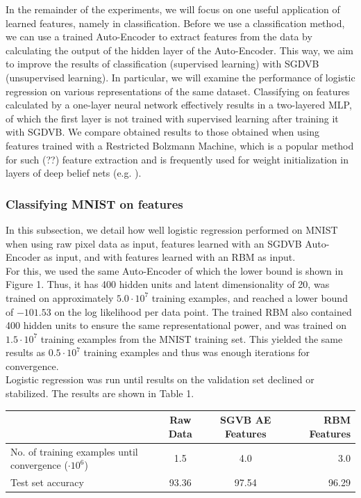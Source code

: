 \documentclass{article}
\begin{document}
In the remainder of the experiments, we will focus on one useful application of learned features, namely in classification. Before we use a classification method, we can use a trained Auto-Encoder to extract features from the data by calculating the output of the hidden layer of the Auto-Encoder. This way, we aim to improve the results of classification (supervised learning) with SGDVB (unsupervised learning). In particular, we will examine the performance of logistic regression on various representations of the same dataset. Classifying on features calculated by a one-layer neural network effectively results in a two-layered MLP, of which the first layer is not trained with supervised learning after training it with SGDVB. We compare obtained results to those obtained when using features trained with a Restricted Bolzmann Machine, which is a popular method for such (??) feature extraction and is frequently used for weight initialization in layers of deep belief nets (e.g. \cite{bengio2007greedy} ).

\subsubsection{Classifying MNIST on features}

In this subsection, we detail how well logistic regression performed on MNIST when using raw pixel data as input, features learned with an SGDVB Auto-Encoder as input, and with features learned with an RBM as input. \\ For this, we used the same Auto-Encoder of which the lower bound is shown in Figure 1. Thus, it has 400 hidden units and latent dimensionality of 20, was trained on approximately $5.0\cdot 10^7$ training examples, and reached a lower bound of $-101.53$ on the log likelihood per data point. The trained RBM also contained 400 hidden units to ensure the same representational power, and was trained on $1.5\cdot 10^7$ training examples from the MNIST training set. This yielded the same results as $0.5\cdot 10^7$ training examples and thus was enough iterations for convergence.\\
Logistic regression was run until results on the validation set declined or stabilized. The results are shown in Table 1.

\begin{table}
\begin{tabular}{|l|c|c|r|}
\hline
& Raw Data & SGVB AE Features & RBM Features \\ \hline
No. of training examples until convergence ($\cdot 10^6$) & 1.5 & 4.0 & 3.0 \\ \hline 
Test set accuracy & 93.36 & 97.54 & 96.29
\end{tabular}
\end{table}
\end{document}
